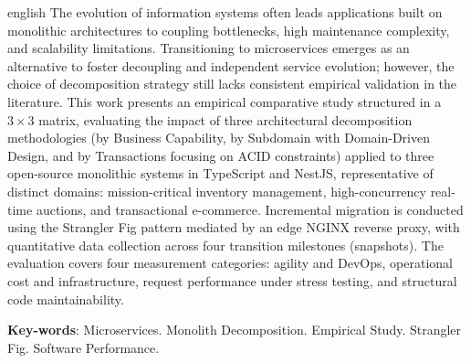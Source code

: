 \begin{resumo}[Abstract]
	\begin{otherlanguage*}{english}
		The evolution of information systems often leads applications built on monolithic architectures to coupling bottlenecks, high maintenance complexity, and scalability limitations. Transitioning to microservices emerges as an alternative to foster decoupling and independent service evolution; however, the choice of decomposition strategy still lacks consistent empirical validation in the literature. This work presents an empirical comparative study structured in a $3 \times 3$ matrix, evaluating the impact of three architectural decomposition methodologies (by Business Capability, by Subdomain with Domain-Driven Design, and by Transactions focusing on ACID constraints) applied to three open-source monolithic systems in TypeScript and NestJS, representative of distinct domains: mission-critical inventory management, high-concurrency real-time auctions, and transactional e-commerce. Incremental migration is conducted using the Strangler Fig pattern mediated by an edge NGINX reverse proxy, with quantitative data collection across four transition milestones (snapshots). The evaluation covers four measurement categories: agility and DevOps, operational cost and infrastructure, request performance under stress testing, and structural code maintainability.
		
		\vspace{\onelineskip}
		
		\noindent 
		\textbf{Key-words}: Microservices. Monolith Decomposition. Empirical Study. Strangler Fig. Software Performance.
	\end{otherlanguage*}
\end{resumo}